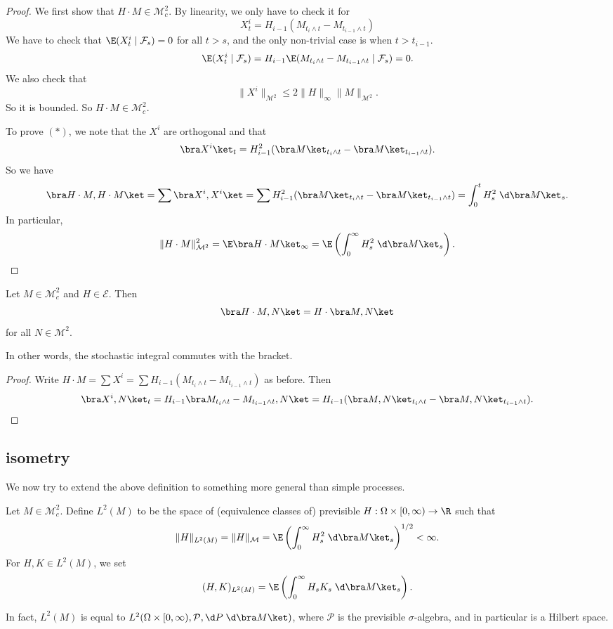 \documentclass[a4paper]{article}
\begin{document}
\begin{proof}
  We first show that $H \cdot M \in \mathcal{M}_c^2$. By linearity, we only have to check it for
  \[
    X_t^i = H_{i - 1} (M_{t_i \wedge t} - M_{t_{i - 1} \wedge t})
  \]
  We have to check that $\E(X_t^i \mid \mathcal{F}_s) = 0$ for all $t > s$, and the only non-trivial case is when $t > t_{i - 1}$.
  \[
    \E (X_t^i \mid \mathcal{F}_s) = H_{i - 1} \E (M_{t_i \wedge t} - M_{t_{i - 1} \wedge t} \mid \mathcal{F}_s) = 0.
  \]
  We also check that
  \[
    \|X^i\|_{\mathcal{M}^2} \leq 2 \|H\|_{\infty} \|M\|_{\mathcal{M}^2}.
  \]
  So it is bounded. So $H \cdot M \in \mathcal{M}_c^2$.

  To prove $(*)$, we note that the $X^i$ are orthogonal and that
  \[
    \bra X^i\ket_t = H_{i - 1}^2 (\bra M\ket_{t_i \wedge t} - \bra M\ket_{t_{i - 1} \wedge t}).
  \]
  So we have
  \[
    \bra H \cdot M, H \cdot M\ket = \sum \bra X^i, X^i\ket = \sum H_{i - 1}^2 (\bra M\ket_{t_i \wedge t} - \bra M\ket_{t_{i - 1} \wedge t}) = \int_0^t H_s^2 \;\d \bra M\ket_s.
  \]
  In particular,
  \[
    \|H \cdot M\|_{\mathcal{M}^2}^2 = \E \bra H \cdot M\ket_\infty = \E \left(\int_0^\infty H_s^2 \;\d \bra M\ket_s\right).\qedhere
  \]
\end{proof}

\begin{prop}
  Let $M \in \mathcal{M}_c^2$ and $H \in \mathcal{E}$. Then
  \[
    \bra H \cdot M, N\ket = H \cdot \bra M, N\ket
  \]
  for all $N \in \mathcal{M}^2$.
\end{prop}
In other words, the stochastic integral commutes with the bracket.

\begin{proof}
  Write $H \cdot M = \sum X^i = \sum H_{i - 1}(M_{t_i \wedge t} - M_{t_{i - 1} \wedge t})$ as before. Then
  \[
    \bra X^i, N\ket_t = H_{i - 1}\bra M_{t_i \wedge t} - M_{t_{i - 1} \wedge t}, N\ket = H_{i - 1} (\bra M, N\ket_{t_i \wedge t} - \bra M, N\ket_{t_{i - 1}\wedge t}).\qedhere
  \]
\end{proof}

\subsection{ isometry}
We now try to extend the above definition to something more general than simple processes.
\begin{defi}[$L^2(M)$]
  Let $M \in \mathcal{M}_c^2$. Define $L^2(M)$ to be the space of (equivalence classes of) previsible $H: \Omega \times [0, \infty) \to \R$ such that
  \[
    \|H\|_{L^2(M)} = \|H\|_{\mathcal{M}} = \E\left(\int_0^\infty H_s^2 \;\d \bra M\ket_s\right)^{1/2} < \infty.
  \]
  For $H, K \in L^2(M)$, we set
  \[
    (H, K)_{L^2(M)} = \E \left(\int_0^\infty H_s K_s \;\d \bra M\ket_s\right).
  \]
\end{defi}
In fact, $L^2(M)$ is equal to $L^2(\Omega \times [0, \infty), \mathcal{P}, \d P\;\d \bra M\ket)$, where $\mathcal{P}$ is the previsible $\sigma$-algebra, and in particular is a Hilbert space.
\end{document}
